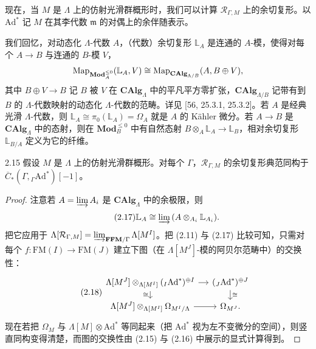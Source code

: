 现在，当 $M$ 是 $\Lambda$ 上的仿射光滑群概形时，我们可以计算 $\mathcal R_{\Gamma,M}$ 上的余切复形。以 $\mathrm{Ad}^*$ 记 $M$ 在其李代数 $\mathfrak m$ 的对偶上的余伴随表示。

我们回忆，对动态化 $\Lambda$-代数 $A$，（代数）余切复形 $\mathbb L_A$ 是连通的 $A$-模，使得对每个 $A\to B$ 与连通的 $B$-模 $V$，
\[
\operatorname{Map}_{\mathbf{Mod}_A^{\le 0}}(\mathbb L_A,V)\cong\operatorname{Map}_{\mathbf{CAlg}_{\Lambda/B}}(A,B\oplus V),
\]
其中 $B\oplus V\to B$ 记 $B$ 被 $V$ 在 $\mathbf{CAlg}_\Lambda$ 中的平凡平方零扩张，$\mathbf{CAlg}_{\Lambda/B}$ 记带有到 $B$ 的 $\Lambda$-代数映射的动态化 $\Lambda$-代数的范畴。详见 [56, 25.3.1, 25.3.2]。若 $A$ 是经典光滑 $\Lambda$-代数，则 $\mathbb L_A\cong\pi_0(\mathbb L_A)=\Omega_A$ 就是 $A$ 的 Kähler 微分。若 $A\to B$ 是 $\mathbf{CAlg}_\Lambda$ 中的态射，则在 $\mathbf{Mod}_B^{\le 0}$ 中有自然态射 $B\otimes_A\mathbb L_A\to\mathbb L_B$，相对余切复形 $\mathbb L_{B/A}$ 定义为它的纤维。

\begin{prop}{2.15}\label{prop:a2-2-15}
假设 $M$ 是 $\Lambda$ 上的仿射光滑群概形。对每个 $\Gamma$，$\mathcal R_{\Gamma,M}$ 的余切复形典范同构于 $\overline{C}_*(\Gamma,{}_\Gamma\mathrm{Ad}^*)[-1]$。
\end{prop}

\begin{proof}
注意若 $A=\varinjlim A_i$ 是 $\mathbf{CAlg}_\Lambda$ 中的余极限，则
\begin{equation}\tag{2.17}
\mathbb L_A\cong\varinjlim\,(A\otimes_{A_i}\mathbb L_{A_i}).
\end{equation}
把它应用于 $\Lambda[\mathcal R_{\Gamma,M}]=\varinjlim_{\mathbf{FFM}/\Gamma}\Lambda[M^I]$。把 (2.11) 与 (2.17) 比较可知，只需对每个 $f:\mathrm{FM}(I)\to\mathrm{FM}(J)$ 建立下图（在 $\Lambda[M^J]$-模的阿贝尔范畴中）的交换性：
\begin{equation}\tag{2.18}
\begin{tikzcd}[column sep=small,row sep=small]
\Lambda[M^J]\otimes_{\Lambda[M^I]}({}_I\mathrm{Ad}^*)^{\oplus I}\arrow[r]\arrow[d,"\cong"'] & ({}_J\mathrm{Ad}^*)^{\oplus J}\arrow[d,"\cong"]\\
\Lambda[M^J]\otimes_{\Lambda[M^I]}\Omega_{M^I/\Lambda}\arrow[r] & \Omega_{M^J}.
\end{tikzcd}
\end{equation}
现在若把 $\Omega_M$ 与 $\Lambda[M]\otimes\mathrm{Ad}^*$ 等同起来（把 $\mathrm{Ad}^*$ 视为左不变微分的空间），则竖直同构变得清楚，而图的交换性由 (2.15) 与 (2.16) 中展示的显式计算得到。
\end{proof}

